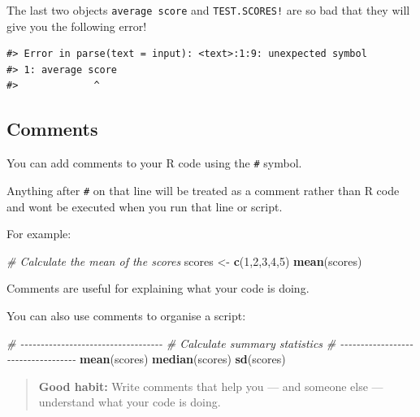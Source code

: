 \documentclass[
]{book}
\newenvironment{Shaded}{\begin{snugshade}}{\end{snugshade}}
\newcommand{\CommentTok}[1]{\textcolor[rgb]{0.56,0.35,0.01}{\textit{#1}}}
\newcommand{\DecValTok}[1]{\textcolor[rgb]{0.00,0.00,0.81}{#1}}
\newcommand{\FunctionTok}[1]{\textcolor[rgb]{0.13,0.29,0.53}{\textbf{#1}}}
\newcommand{\NormalTok}[1]{#1}
\newcommand{\OtherTok}[1]{\textcolor[rgb]{0.56,0.35,0.01}{#1}}
\begin{document}
The last two objects \texttt{average\ score} and \texttt{TEST.SCORES!} are so bad that they will give you the following error!

\begin{verbatim}
#> Error in parse(text = input): <text>:1:9: unexpected symbol
#> 1: average score
#>             ^
\end{verbatim}

\subsection{Comments}\label{comments}

You can add comments to your R code using the \texttt{\#} symbol.

Anything after \texttt{\#} on that line will be treated as a comment rather than R code and wont be executed when you run that line or script.

For example:

\begin{Shaded}
\begin{Highlighting}[]
\CommentTok{\# Calculate the mean of the scores}
\NormalTok{scores }\OtherTok{\textless{}{-}} \FunctionTok{c}\NormalTok{(}\DecValTok{1}\NormalTok{,}\DecValTok{2}\NormalTok{,}\DecValTok{3}\NormalTok{,}\DecValTok{4}\NormalTok{,}\DecValTok{5}\NormalTok{)}
\FunctionTok{mean}\NormalTok{(scores)}
\end{Highlighting}
\end{Shaded}

Comments are useful for explaining what your code is doing.

You can also use comments to organise a script:

\begin{Shaded}
\begin{Highlighting}[]
\CommentTok{\# {-}{-}{-}{-}{-}{-}{-}{-}{-}{-}{-}{-}{-}{-}{-}{-}{-}{-}{-}{-}{-}{-}{-}{-}{-}{-}{-}{-}{-}{-}{-}{-}{-}{-}{-}}
\CommentTok{\# Calculate summary statistics}
\CommentTok{\# {-}{-}{-}{-}{-}{-}{-}{-}{-}{-}{-}{-}{-}{-}{-}{-}{-}{-}{-}{-}{-}{-}{-}{-}{-}{-}{-}{-}{-}{-}{-}{-}{-}{-}{-}}
\FunctionTok{mean}\NormalTok{(scores)}
\FunctionTok{median}\NormalTok{(scores)}
\FunctionTok{sd}\NormalTok{(scores)}
\end{Highlighting}
\end{Shaded}

\begin{quote}
\textbf{Good habit:} Write comments that help you --- and someone else --- understand what your code is doing.
\end{quote}
\end{document}
